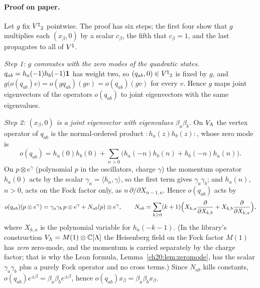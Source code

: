 \paragraph{Proof on paper.}  Let $g$ fix ${V^{\natural}}_2$ pointwise.  The proof has six steps; the first four show that
$g$ multiplies each $(x_\beta,0)$ by a scalar $c_\beta$, the fifth that $c_\beta=1$, and the last propagates to all of
${V^{\natural}}$.

\emph{Step 1: $g$ commutes with the zero modes of the quadratic states.}  $q_{ab}=h_a(-1)h_b(-1)\mathbf 1$ has
weight two, so $(q_{ab},0)\in{V^{\natural}}_2$ is fixed by $g$, and
$g\bigl(o(q_{ab})v\bigr)=o(gq_{ab})(gv)=o(q_{ab})(gv)$ for every $v$.  Hence $g$ maps joint eigenvectors of the
operators $o(q_{ab})$ to joint eigenvectors with the same eigenvalues.

\emph{Step 2: $(x_\beta,0)$ is a joint eigenvector with eigenvalues $\beta_a\beta_b$.}  On $V_{\Lambda}$ the vertex
operator of $q_{ab}$ is the normal-ordered product ${:}h_a(z)h_b(z){:}$, whose zero mode is
\begin{equation*}
  o(q_{ab})=h_a(0)h_b(0)+\sum_{n>0}\bigl(h_a(-n)h_b(n)+h_b(-n)h_a(n)\bigr).
\end{equation*}
On $p\otimes e^\gamma$ (polynomial $p$ in the oscillators, charge $\gamma$) the momentum operator $h_a(0)$ acts by the
scalar $\gamma_a=\langle h_a,\gamma\rangle$, so the first term gives $\gamma_a\gamma_b$; and $h_a(n)$, $n>0$, acts on the Fock
factor only, as $n\,\partial/\partial X_{n-1,a}$.  Hence $o(q_{ab})$ acts by
\begin{equation}\label{ch20:eq:zeromode}
  o(q_{ab})(p\otimes e^\gamma)=\gamma_a\gamma_b\,p\otimes e^\gamma+N_{ab}(p)\otimes e^\gamma,\qquad
  N_{ab}=\sum_{k\ge0}(k+1)\Bigl(X_{k,a}\frac{\partial}{\partial X_{k,b}}+X_{k,b}\frac{\partial}{\partial X_{k,a}}\Bigr),
\end{equation}
where $X_{k,a}$ is the polynomial variable for $h_a(-k-1)$.  (In the library's construction $V_{\Lambda}=M(1)\otimes{\mathbb{C}}[{\Lambda}]$
the Heisenberg field on the Fock factor $M(1)$ has \emph{zero} zero-mode, and the momentum is carried separately by the
charge factor; that is why the Lean formula, Lemma~\ref{ch20:lem:zeromode}, has the scalar $\gamma_a\gamma_b$ plus a purely
Fock operator and no cross terms.)  Since
$N_{ab}$ kills constants, $o(q_{ab})e^{\pm\beta}=\beta_a\beta_b e^{\pm\beta}$, hence $o(q_{ab})x_\beta=\beta_a\beta_bx_\beta$.

